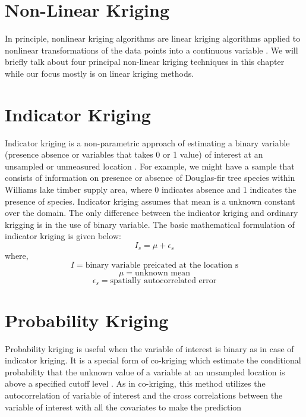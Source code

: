 \documentclass[
]{book}
\begin{document}
\hypertarget{non-linear-kriging}{%
\section{Non-Linear Kriging}\label{non-linear-kriging}}

In principle, nonlinear kriging algorithms are linear kriging algorithms applied to nonlinear transformations of the data points into a continuous variable \citep{deutsch_gslib_1993}. We will briefly talk about four principal non-linear kriging techniques in this chapter while our focus mostly is on linear kriging methods.

\hypertarget{indicator-kriging}{%
\section{Indicator Kriging}\label{indicator-kriging}}

Indicator kriging is a non-parametric approach of estimating a binary variable (presence absence or variables that takes 0 or 1 value) of interest at an unsampled or unmeasured location \citep{journel_nonparametric_1983}. For example, we might have a sample that consists of information on presence or absence of Douglas-fir tree species within Williams lake timber supply area, where 0 indicates absence and 1 indicates the presence of species. Indicator kriging assumes that mean is a unknown constant over the domain. The only difference between the indicator kriging and ordinary krigging is in the use of binary variable. The basic mathematical formulation of indicator kriging is given below:
\[I_{s}= \mu + \epsilon_{s}\]
where, \[I= \text{binary variable preicated at the location s}\]
\[\mu= \text{unknown mean}\]
\[\epsilon_{s}=\text{spatially autocorrelated error}\]

\hypertarget{probability-kriging}{%
\section{Probability Kriging}\label{probability-kriging}}

Probability kriging is useful when the variable of interest is binary as in case of indicator kriging. It is a special form of co-kriging which estimate the conditional probability that the unknown value of a variable at an unsampled location is above a specified cutoff level \citep{carr_general_1993}. As in co-kriging, this method utilizes the autocorrelation of variable of interest and the cross correlations between the variable of interest with all the covariates to make the prediction \citep{carr_general_1993}
\end{document}
